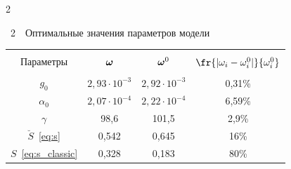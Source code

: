 \begin{multicols}{2}
{\begin{center}
 \noindent

{{\tablename~2}\ \ \small{Оптимальные значения параметров модели}}





\vspace*{2ex}





    \begin{tabular}{|c|c|c|c|}

    \hline

    &&&\\[-9pt]

              Параметры  &  $\boldsymbol{\omega}$    &$\boldsymbol{\omega}^0$   & $\fr{|\omega_i - \omega^0_i|}{\omega^0_i}$\\

              \hline

            &&&\\[-9pt]

$g_0$ &  $2{,}93\cdot 10^{-3}$ & $2{,}92\cdot 10^{-3}$ & 0,31\%\\

$\alpha_0$   &$2{,}07\cdot 10^{-4}$& $2{,}22\cdot 10^{-4}$& 6,59\%\\

 $\gamma$      & 98,6& 101,5& 2,9\%\hphantom{9}\\

        $\breve{S}$~\eqref{eq:s} &  0,542& 0,645& 16\%\hphantom{999}\\

        $S$~\eqref{eq:s_classic} & 0,328& 0,183& 80\%\hphantom{999}\\ 

        \hline

  \end{tabular}

  \end{center}

  }







\vspace*{3pt}



\addtocounter{table}{1}



{ \begin{center}  %


\end{center}}
\end{multicols}

